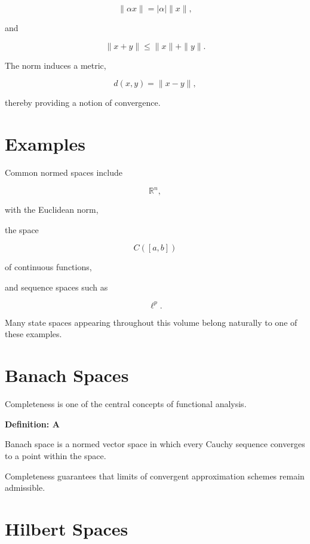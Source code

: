 \documentclass[11pt,fleqn]{book}
\numberwithin{equation}{chapter}
\newenvironment{definition}[1]
  {\begin{definitionEnv}
   \noindent\textbf{Definition: #1}\par\smallskip}
  {\end{definitionEnv}}
\theoremstyle{plain}
\theoremstyle{definition}
\theoremstyle{remark}
\begin{document}
\[
\|\alpha x\|
=
|\alpha|
\|x\|,
\]

and

\[
\|x+y\|
\le
\|x\|
+
\|y\|.
\]

The norm induces a metric,

\[
d(x,y)
=
\|x-y\|,
\]

thereby providing a notion of convergence.


\section{Examples}

Common normed spaces include

\[
\mathbb R^n,
\]

with the Euclidean norm,

the space

\[
C([a,b])
\]

of continuous functions,

and sequence spaces such as

\[
\ell^p.
\]

Many state spaces appearing throughout this volume belong naturally to
one of these examples.


\section{Banach Spaces}

Completeness is one of the central concepts of functional analysis.

\begin{definition}

A Banach space is a normed vector space in which every Cauchy sequence
converges to a point within the space.

\end{definition}

Completeness guarantees that limits of convergent approximation schemes
remain admissible.


\section{Hilbert Spaces}
\end{document}
